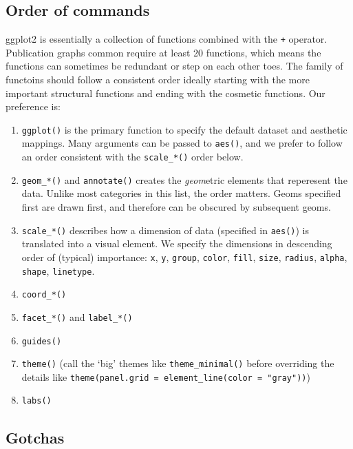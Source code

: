 \documentclass[
]{book}
\providecommand{\tightlist}{%
  \setlength{\itemsep}{0pt}\setlength{\parskip}{0pt}}
\begin{document}
\hypertarget{style-ggplot-order}{%
\subsection{Order of commands}\label{style-ggplot-order}}

ggplot2 is essentially a collection of functions combined with the \texttt{+} operator. Publication graphs common require at least 20 functions, which means the functions can sometimes be redundant or step on each other toes. The family of functoins should follow a consistent order ideally starting with the more important structural functions and ending with the cosmetic functions. Our preference is:

\begin{enumerate}
\def\labelenumi{\arabic{enumi}.}
\tightlist
\item
  \texttt{ggplot()} is the primary function to specify the default dataset and aesthetic mappings. Many arguments can be passed to \texttt{aes()}, and we prefer to follow an order consistent with the \texttt{scale\_*()} order below.
\item
  \texttt{geom\_*()} and \texttt{annotate()} creates the \emph{geom}etric elements that reperesent the data. Unlike most categories in this list, the order matters. Geoms specified first are drawn first, and therefore can be obscured by subsequent geoms.
\item
  \texttt{scale\_*()} describes how a dimension of data (specified in \texttt{aes()}) is translated into a visual element. We specify the dimensions in descending order of (typical) importance: \texttt{x}, \texttt{y}, \texttt{group}, \texttt{color}, \texttt{fill}, \texttt{size}, \texttt{radius}, \texttt{alpha}, \texttt{shape}, \texttt{linetype}.
\item
  \texttt{coord\_*()}
\item
  \texttt{facet\_*()} and \texttt{label\_*()}
\item
  \texttt{guides()}
\item
  \texttt{theme()} (call the `big' themes like \texttt{theme\_minimal()} before overriding the details like \texttt{theme(panel.grid\ =\ element\_line(color\ =\ "gray"))})
\item
  \texttt{labs()}
\end{enumerate}

\hypertarget{style-ggplot-gotchas}{%
\subsection{Gotchas}\label{style-ggplot-gotchas}}
\end{document}
